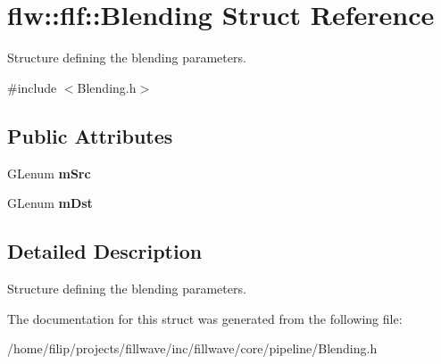 \hypertarget{structflw_1_1flf_1_1Blending}{}\section{flw\+:\+:flf\+:\+:Blending Struct Reference}
\label{structflw_1_1flf_1_1Blending}


Structure defining the blending parameters.  




{\ttfamily \#include $<$Blending.\+h$>$}

\subsection*{Public Attributes}
\begin{DoxyCompactItemize}
\item 
\mbox{\label{structflw_1_1flf_1_1Blending_a051e5468c6f0896c3c7c284380e617f0}} 
G\+Lenum {\bfseries m\+Src}
\item 
\mbox{\label{structflw_1_1flf_1_1Blending_a5509a580e67f5ffc8411e7be25e28fdd}} 
G\+Lenum {\bfseries m\+Dst}
\end{DoxyCompactItemize}


\subsection{Detailed Description}
Structure defining the blending parameters. 

The documentation for this struct was generated from the following file\+:\begin{DoxyCompactItemize}
\item 
/home/filip/projects/fillwave/inc/fillwave/core/pipeline/Blending.\+h\end{DoxyCompactItemize}
